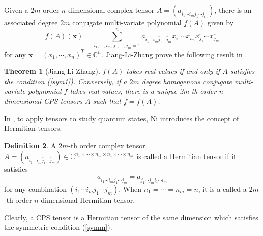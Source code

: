 \documentclass[10pt,reqno]{amsart}
\newtheorem{thm}{Theorem}[section]
\theoremstyle{definition}
\newtheorem{defn}[thm]{Definition}
\begin{document}
 Given a $2m$-order $n$-dimensional complex tensor $A=(a_{i_1\cdots i_m\bar{j}_1\cdots \bar{j}_m})$, there is an associated degree $2m$ conjugate multi-variate polynomial $f(A)$ given by
 $$f(A)(\mathbf{x})=\sum_{i_1,\cdots, i_m, j_1, \cdots, j_m=1}^n a_{i_1\cdots i_m\bar{j}_1\cdots \bar{j}_m} x_{i_1}\cdots x_{i_m}\overline{x_{j_1}}\cdots\overline{x_{j_m}}$$ for any $\mathbf{x}=(x_1,\cdots, x_n)^T\in \mathbb C^n$. Jiang-Li-Zhang prove the following result in \cite{JLZ}.
\begin{thm}[Jiang-Li-Zhang] \label{thm2.8} $f(A)$ takes real values if and only if $A$ satisfies the condition (\ref{sym1}). Conversely, if a $2m$ degree homogenous conjugate multi-variate polynomial $f$ takes real values, there is a unique 2m-th order n-dimensional CPS tensors $A$ such that $f=f(A)$.
\end{thm}
In \cite{N}, to apply tensors to study quantum states, Ni introduces the concept of Hermitian tensors. 
\begin{defn} A $2m$-th order complex tensor $A=(a_{i_1\cdots i_m\bar{j}_1\cdots \bar{j}_m})\in \mathbb C^{n_1\times \cdots \times n_m\times n_1\times \cdots \times n_m}$ is called a Hermitian tensor if it satisfies $$\overline{a_{i_1\cdots i_m\bar{j}_1\cdots \bar{j}_m}}=a_{j_1\cdots j_m\bar{i}_1\cdots \bar{i}_m}$$ for any combination $(i_1\cdots i_mj_1\cdots j_m)$. 
When $n_1=\cdots=n_m=n$, it is a called a $2m$-th order $n$-dimensional Hermitian tensor.
\end{defn}
Clearly, a CPS tensor is a Hermitian tensor of the same dimension which satisfies the symmetric condition (\ref{symm}).
\end{document}
